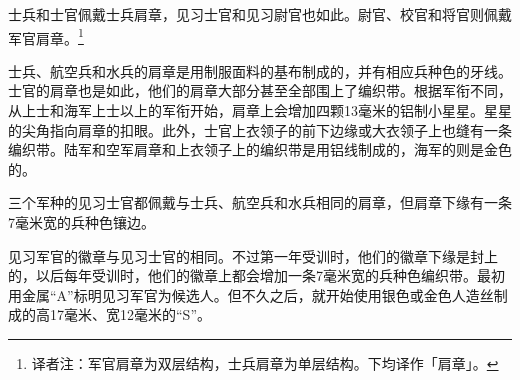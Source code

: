 士兵和士官佩戴士兵肩章，见习士官和见习尉官也如此。尉官、校官和将官则佩戴军官肩章。\footnote{译者注：军官肩章为双层结构，士兵肩章为单层结构。\cite{clarionv}下均译作「肩章」。}

士兵、航空兵和水兵的肩章是用制服面料的基布制成的，并有相应兵种色的牙线。士官的肩章也是如此，他们的肩章大部分甚至全部围上了编织带。根据军衔不同，从上士和海军上士以上的军衔开始，肩章上会增加四颗13毫米的铝制小星星。星星的尖角指向肩章的扣眼。此外，士官上衣领子的前下边缘或大衣领子上也缝有一条编织带。陆军和空军肩章和上衣领子上的编织带是用铝线制成的，海军的则是金色的。

三个军种的见习士官都佩戴与士兵、航空兵和水兵相同的肩章，但肩章下缘有一条7毫米宽的兵种色镶边。

见习军官的徽章与见习士官的相同。不过第一年受训时，他们的徽章下缘是封上的，以后每年受训时，他们的徽章上都会增加一条7毫米宽的兵种色编织带。最初用金属“A”标明见习军官为候选人。但不久之后，就开始使用银色或金色人造丝制成的高17毫米、宽12毫米的“S”。

